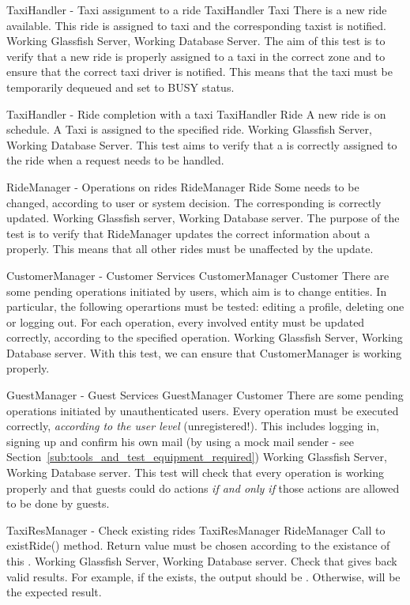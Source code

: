 \testx
{TaxiHandler - Taxi assignment to a ride}
{TaxiHandler}
{Taxi}
{There is a new ride available.}
{This ride is assigned to taxi and the corresponding taxist is notified.}
{Working Glassfish Server, Working Database Server.}
{The aim of this test is to verify that a new ride is properly assigned to
a taxi in the correct zone and to ensure that the correct taxi driver is notified. This means that the taxi must be temporarily dequeued and set to BUSY status.}

\testx
{TaxiHandler - Ride completion with a taxi}
{TaxiHandler}
{Ride}
{A new ride is on schedule.}
{A Taxi is assigned to the specified ride.}
{Working Glassfish Server, Working Database Server.}
{This test aims to verify that a  is correctly assigned to the ride
when a request needs to be handled.}

\testx
{RideManager - Operations on rides}
{RideManager}
{Ride}
{Some  needs to be changed, according to user or system decision.}
{The corresponding  is correctly updated.}
{Working Glassfish server, Working Database server.}
{The purpose of the test is to verify that RideManager updates the correct
information about a  properly. This means that all other rides must be unaffected by the update.}

\testx
{CustomerManager - Customer Services}
{CustomerManager}
{Customer}
{There are some pending operations initiated by users, which aim is to change
 entities. In particular, the following operartions must be tested: editing a profile, deleting one or logging out.}
{For each operation, every involved  entity must be updated correctly,
according to the specified operation.}
{Working Glassfish Server, Working Database server.}
{With this test, we can ensure that CustomerManager is working properly.}

\testx
{GuestManager - Guest Services}
{GuestManager}
{Customer}
{There are some pending operations initiated by unauthenticated users.}
{Every operation must be executed correctly, \emph{according to the user level}
(unregistered!). This includes logging in, signing up and confirm his own mail (by using a mock mail sender - see Section~\ref{sub:tools_and_test_equipment_required})}
{Working Glassfish Server, Working Database server.}
{This test will check that every  operation is working properly
and that guests could do actions \emph{if and only if} those actions are allowed to be done by guests.}

\testx
{TaxiResManager - Check existing rides}
{TaxiResManager}
{RideManager}
{Call to existRide() method.}
{Return value must be chosen according to the existance of this .}
{Working Glassfish Server, Working Database server.}
{Check that  gives back valid results. For example, if
the  exists, the output should be . Otherwise,
 will be the expected result.}

